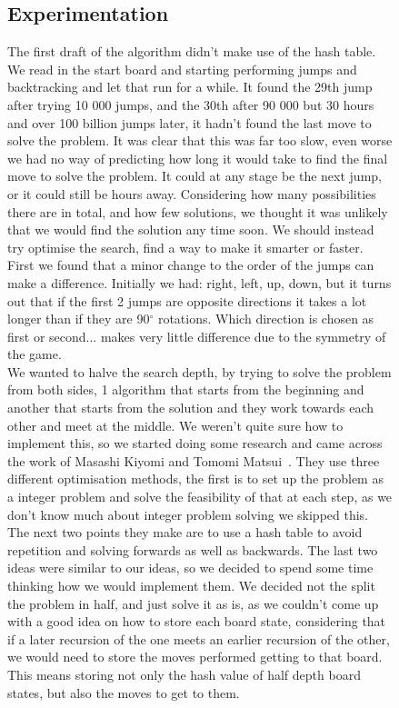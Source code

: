 \documentclass[11pt]{article}
\begin{document}
\begin{figure}
\subsection{Experimentation}
The first draft of the algorithm didn't make use of the hash table. We read in the start board and starting performing jumps and backtracking and let that run for a while.
It found the 29th jump after trying 10 000 jumps, and the 30th after 90 000 but 30 hours and over 100 billion jumps later, it hadn't found the last move to solve the problem.\newline
It was clear that this was far too slow, even worse we had no way of predicting how long it would take to find the final move to solve the problem. It could at any stage be the next jump, or it could still be hours away. Considering how many possibilities there are in total, and how few solutions, we thought it was unlikely that we would find the solution any time soon. We should instead try optimise the search, find a way to make it smarter or faster.\\
First we found that a minor change to the order of the jumps can make a difference. Initially we had: right, left, up, down, but it turns out that if the first 2 jumps are opposite directions it takes a lot longer than if they are 90$^{\circ}$ rotations. Which direction is chosen as first or second... makes very little difference due to the symmetry of the game.\\\newline
We wanted to halve the search depth, by trying to solve the problem from both sides, 1 algorithm that starts from the beginning and another that starts from the solution and they work towards each other and meet at the middle.
We weren't quite sure how to implement this, so we started doing some research and came across the work of Masashi Kiyomi and Tomomi Matsui~\cite{Tomomi}.
They use three different optimisation methods, the first is to set up the problem as a integer problem and solve the feasibility of that at each step, as we don't know much about integer problem solving we skipped this.\newline
The next two points they make are to use a hash table to avoid repetition and solving forwards as well as backwards. The last two ideas were similar to our ideas, so we decided to spend some time thinking how we would implement them.\newline
We decided not the split the problem in half, and just solve it as is, as we couldn't come up with a good idea on how to store each board state, considering that if a later recursion of the one meets an earlier recursion of the other, we would need to store the moves performed getting to that board. This means storing not only the hash value of half depth board states, but also the moves to get to them.

\end{figure}
\end{document}
